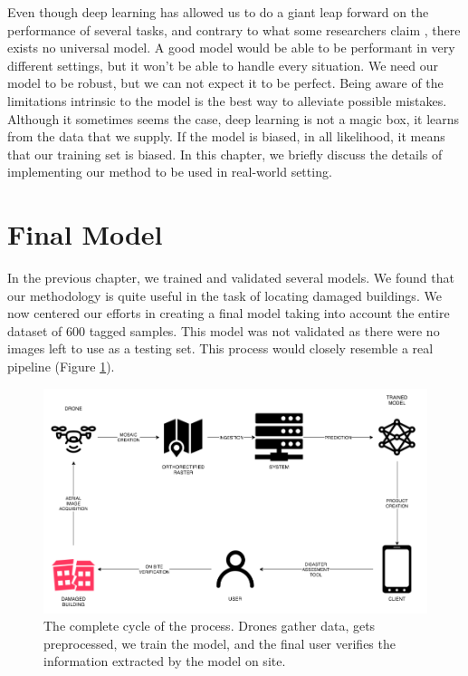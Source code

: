 Even though deep learning has allowed us to do a giant leap forward on the performance of several tasks, and contrary to what some researchers claim \cite{DBLP:journals/corr/KaiserGSVPJU17}, there exists no universal model. A good model would be able to be performant in very different settings, but it won't be able to handle every situation. We need our model to be robust, but we can not expect it to be perfect. Being aware of the limitations intrinsic to the model is the best way to alleviate possible mistakes. Although it sometimes seems the case, deep learning is not a magic box, it learns from the data that we supply. If the model is biased, in all likelihood, it means that our training set is biased. In this chapter, we briefly discuss the details of implementing our method to be used in real-world setting.\\

\section{Final Model}

In the previous chapter, we trained and validated several models. We found that our methodology is quite useful in the task of locating damaged buildings. We now centered our efforts in creating a final model taking into account the entire dataset of 600 tagged samples. This model was not validated as there were no images left to use as a testing set. This process would closely resemble a real pipeline (Figure \ref{fig:process}).\\


\begin{figure}[!h]
  \centering
  \includegraphics[width=1\textwidth]{images/process-diagram.png}
  \caption{The complete cycle of the process. Drones gather data, gets preprocessed, we train the model, and the final user verifies the information extracted by the model on site.}
  \label{fig:process}
\end{figure}


